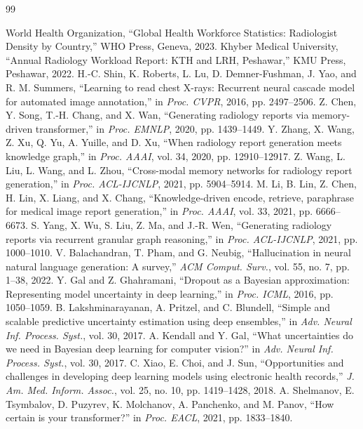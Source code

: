 \documentclass{jcst}
\begin{document}
\begin{thebibliography}{99}
\raggedright
{} World Health Organization, ``Global Health Workforce Statistics: Radiologist Density by Country,'' WHO Press, Geneva, 2023.
 Khyber Medical University, ``Annual Radiology Workload Report: KTH and LRH, Peshawar,'' KMU Press, Peshawar, 2022.
 H.-C. Shin, K. Roberts, L. Lu, D. Demner-Fushman, J. Yao, and R. M. Summers, ``Learning to read chest X-rays: Recurrent neural cascade model for automated image annotation,'' in \textit{Proc. CVPR}, 2016, pp. 2497–2506.
 Z. Chen, Y. Song, T.-H. Chang, and X. Wan, ``Generating radiology reports via memory-driven transformer,'' in \textit{Proc. EMNLP}, 2020, pp. 1439–1449.
 Y. Zhang, X. Wang, Z. Xu, Q. Yu, A. Yuille, and D. Xu, ``When radiology report generation meets knowledge graph,'' in \textit{Proc. AAAI}, vol. 34, 2020, pp. 12910–12917.
 Z. Wang, L. Liu, L. Wang, and L. Zhou, ``Cross-modal memory networks for radiology report generation,'' in \textit{Proc. ACL-IJCNLP}, 2021, pp. 5904–5914.
 M. Li, B. Lin, Z. Chen, H. Lin, X. Liang, and X. Chang, ``Knowledge-driven encode, retrieve, paraphrase for medical image report generation,'' in \textit{Proc. AAAI}, vol. 33, 2021, pp. 6666–6673.
 S. Yang, X. Wu, S. Liu, Z. Ma, and J.-R. Wen, ``Generating radiology reports via recurrent granular graph reasoning,'' in \textit{Proc. ACL-IJCNLP}, 2021, pp. 1000–1010.
 V. Balachandran, T. Pham, and G. Neubig, ``Hallucination in neural natural language generation: A survey,'' \textit{ACM Comput. Surv.}, vol. 55, no. 7, pp. 1–38, 2022.
 Y. Gal and Z. Ghahramani, ``Dropout as a Bayesian approximation: Representing model uncertainty in deep learning,'' in \textit{Proc. ICML}, 2016, pp. 1050–1059.
 B. Lakshminarayanan, A. Pritzel, and C. Blundell, ``Simple and scalable predictive uncertainty estimation using deep ensembles,'' in \textit{Adv. Neural Inf. Process. Syst.}, vol. 30, 2017.
 A. Kendall and Y. Gal, ``What uncertainties do we need in Bayesian deep learning for computer vision?'' in \textit{Adv. Neural Inf. Process. Syst.}, vol. 30, 2017.
 C. Xiao, E. Choi, and J. Sun, ``Opportunities and challenges in developing deep learning models using electronic health records,'' \textit{J. Am. Med. Inform. Assoc.}, vol. 25, no. 10, pp. 1419–1428, 2018.
 A. Shelmanov, E. Tsymbalov, D. Puzyrev, K. Molchanov, A. Panchenko, and M. Panov, ``How certain is your transformer?'' in \textit{Proc. EACL}, 2021, pp. 1833–1840.

\end{thebibliography}
\end{document}
